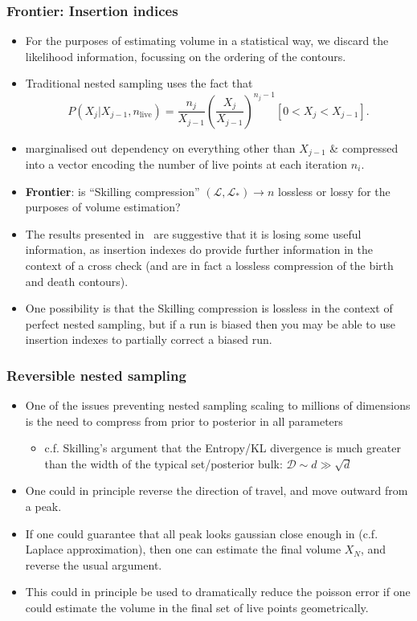 \documentclass[aspectratio=169,handout]{beamer}
\begin{document}
\begin{frame}
    \frametitle{Frontier: Insertion indices}

\begin{itemize}
    \item For the purposes of estimating volume in a statistical way, we discard the likelihood information, focussing on the ordering of the contours. 
    \item Traditional nested sampling uses the fact that
\[
    P(X_j|X_{j-1}, n_\mathrm{live}) = \frac{n_j}{X_{j-1}}\left( \frac{X_j}{X_{j-1}} \right)^{n_j-1} [0<X_j<X_{j-1}].
    \]
\item marginalised out dependency on everything other than $X_{j-1}$ \&  compressed into a vector encoding the number of live points at each iteration $n_i$. 
\item  \textbf{Frontier}: is ``Skilling compression'' $(\mathcal{L},\mathcal{L}_*)\to n$ lossless or lossy for the purposes of volume estimation?
\item The results presented in~ are suggestive that it is losing some useful information, as insertion indexes do provide further information in the context of a cross check (and are in fact a lossless compression of the birth and death contours). 
\item One possibility is that the Skilling compression is lossless in the context of perfect nested sampling, but if a run is biased then you may be able to use insertion indexes to partially correct a biased run. 
\end{itemize}
\end{frame}

\begin{frame}
    \frametitle{Reversible nested sampling}
    \begin{itemize}
        \item One of the issues preventing nested sampling scaling to millions of dimensions is the need to compress from prior to posterior in all parameters 
            \begin{itemize}
                \item c.f. Skilling's argument that the Entropy/KL divergence is much greater than the width of the typical set/posterior bulk: $\mathcal{D}\sim d \gg \sqrt{d}$
            \end{itemize}
        \item One could in principle reverse the direction of travel, and move outward from a peak.
        \item If one could guarantee that all peak looks gaussian close enough in (c.f. Laplace approximation), then one can estimate the final volume $X_N$, and reverse the usual argument.
        \item This could in principle be used to dramatically reduce the poisson error if one could estimate the volume in the final set of live points geometrically.
    \end{itemize}
\end{frame}
\end{document}
